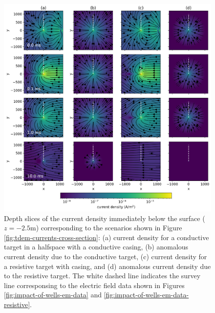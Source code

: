 \begin{figure}[!htb]
    \begin{center}
    \includegraphics[width=1\textwidth]{figures/tdem-currents-depth-slice-target.png}
    \end{center}
\caption{
    Depth slices of the current density immediately below the surface ($z=-2.5$m) corresponding to the scenarios shown in Figure \ref{fig:tdem-currents-cross-section}: (a) current density for a conductive target in a halfspace with a conductive casing, (b) anomalous current density due to the conductive target, (c) current density for a resistive target with casing, and (d) anomalous current density due to the resistive target. The white dashed line indicates the survey line corresponsing to the electric field data shown in Figures \ref{fig:impact-of-wells-em-data} and \ref{fig:impact-of-wells-em-data-resistive}.
}
\label{fig:tdem-currents-depth-slice-target}
\end{figure}
